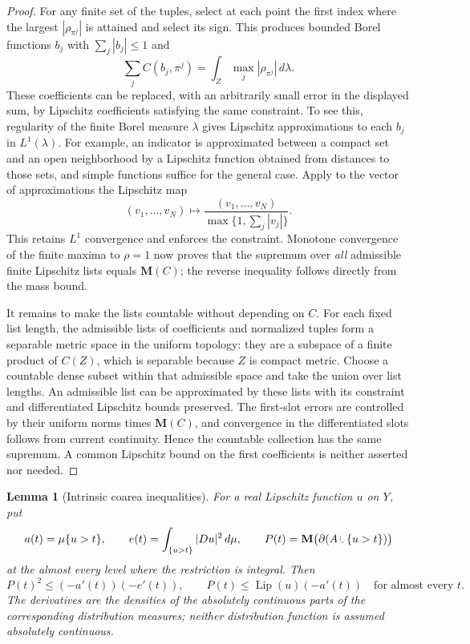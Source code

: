 \documentclass[11pt]{article}
\numberwithin{equation}{section}
\newtheorem{lemma}[theorem]{Lemma}
\theoremstyle{definition}
\theoremstyle{remark}
\begin{document}
\begin{proof}
For any finite set of the tuples, select at each point the first index
where the largest $|\rho_{\pi^j}|$ is attained and select its sign.
This produces bounded Borel functions $b_j$ with
$\sum_j|b_j|\le1$ and
\[
 \sum_j C(b_j,\pi^j)
   =\int_Z\max_j|\rho_{\pi^j}|\,d\lambda.
\]
These coefficients can be replaced, with an arbitrarily small error
in the displayed sum, by Lipschitz coefficients satisfying the same
constraint.  To see this, regularity of the finite Borel measure
$\lambda$ gives Lipschitz approximations to each $b_j$ in
$L^1(\lambda)$.  For example, an indicator is approximated between a
compact set and an open neighborhood by a Lipschitz function obtained
from distances to those sets, and simple functions suffice for the
general case.  Apply to the vector of approximations the Lipschitz map
\[
 (v_1,\ldots,v_N)\longmapsto
 \frac{(v_1,\ldots,v_N)}{\max\{1,\sum_j|v_j|\}}.
\]
This retains $L^1$ convergence and enforces the constraint.
Monotone convergence of the finite maxima to $\rho=1$ now proves that
the supremum over \emph{all} admissible finite Lipschitz lists equals
$\mathbf M(C)$; the reverse inequality follows directly from the mass bound.

It remains to make the lists countable without depending on $C$.
For each fixed list length, the admissible lists of coefficients and
normalized tuples form a separable metric space in the uniform
topology: they are a subspace of a finite product of $C(Z)$, which is
separable because $Z$ is compact metric.  Choose a countable dense
subset within that admissible space and take the union over list
lengths.  An admissible list can be approximated by these lists with
its constraint and differentiated Lipschitz bounds preserved.
The first-slot errors are controlled by their uniform norms times
$\mathbf M(C)$, and convergence in the differentiated slots follows from
current continuity.  Hence the countable collection has the same
supremum.  A common Lipschitz bound on the first coefficients is
neither asserted nor needed.
\end{proof}

\begin{lemma}[Intrinsic coarea inequalities]
\label{lem:intrinsic-coarea}
For a real Lipschitz function $u$ on $Y$, put
\[
 a(t)=\mu\{u>t\},\qquad
 e(t)=\int_{\{u>t\}}|Du|^2\,d\mu,
 \qquad P(t)=\mathbf M\bigl(\partial(A\mathbin{\vrule height 1.4ex depth -0.3ex width .07ex\vrule height .07ex depth 0ex width .7ex}\{u>t\})\bigr)
\]
at the almost every level where the restriction is integral.  Then
\begin{equation}
 P(t)^2\le(-a'(t))(-e'(t)),\qquad
 P(t)\le\operatorname{Lip}(u)(-a'(t))
 \quad\text{for almost every }t.
 \label{eq:intrinsic-coarea}
\end{equation}
The derivatives are the densities of the absolutely continuous parts
of the corresponding distribution measures; neither distribution
function is assumed absolutely continuous.
\end{lemma}
\end{document}
